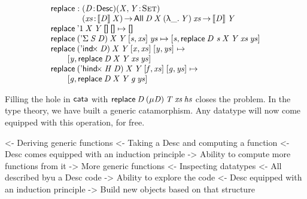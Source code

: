 \[\stk{
\F{replace} : \stk{\PITEL{\V{D}}{\Desc}
                   \PITEL{\V{X},\V{Y}}{\Set}\\
                   \PI{\V{xs}}{\descop{\V{D}}{\V{X}}} 
                   \All{\V{D}}{\V{X}}{(\LAM{\_}\V{Y})}{\V{xs}} \To
                   \descop{\V{D}}{\V{Y}}} \\
\F{replace}\: \DUnit\:          \V{X}\: \V{Y}\: \Void\:          \Void          \mapsto 
    \Void                                                                                                         \\
\F{replace}\: (\DSigma{\V{S}}{\V{D}})\: \V{X}\: \V{Y}\: \pair{\V{s}}{\V{xs}}{}\: \V{ys}             \mapsto
    \pair{\V{s}}{\F{replace}\: {\V{D}~\V{s}}\: \V{X}\: \V{Y}\: \V{xs}\: \V{ys}}{}                                 \\
\F{replace}\: (\DIndx{\V{D}})\:     \V{X}\: \V{Y}\: \pair{\V{x}}{\V{xs}}{}\: \pair{\V{y}}{\V{ys}}{} \mapsto       \\
\qquad  \pair{\V{y}}{\F{replace}\: \V{D}\: \V{X}\: \V{Y}\: \V{xs}\: \V{ys}}{}                                     \\
\F{replace}\: (\DHindx{\V{H}}{\V{D}})\: \V{X}\: \V{Y}\: \pair{\V{f}}{\V{xs}}{}\: \pair{\V{g}}{\V{ys}}{} \mapsto   \\
\qquad  \pair{\V{g}}{\F{replace}\: \V{D}\: \V{X}\: \V{Y}\: \V{g}\: \V{ys}}{}
}\]

Filling the hole in $\F{cata}$ with \(\F{replace}\: \V{D}\:
(\Mu{\V{D}})\: \V{T}\: \V{xs}\: \V{hs}\) closes the problem. In the
type theory, we have built a generic catamorphism. Any datatype will
now come equipped with this operation, for free.


\begin{wstructure}
<- Deriving generic functions
    <- Taking a Desc and computing a function
        <- Desc comes equipped with an induction principle
        -> Ability to compute more functions from it
            -> More generic functions
    <- Inspecting datatypes
        <- All described byu a Desc code
        -> Ability to explore the code
            <- Desc equipped with an induction principle
            -> Build new objects based on that structure
\end{wstructure}

